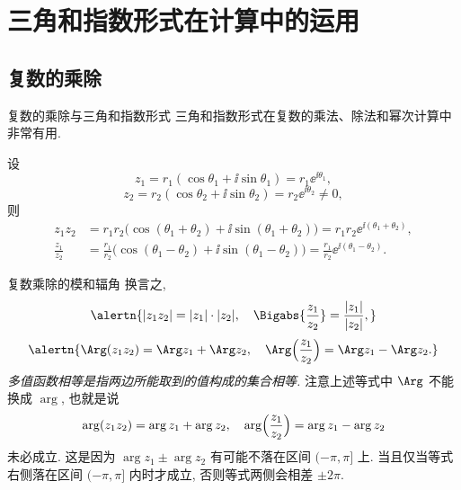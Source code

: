\section{三角和指数形式在计算中的运用}

\subsection{复数的乘除}

\begin{frame}{复数的乘除与三角和指数形式}
	\onslide<+->
	三角和指数形式在复数的乘法、除法和幂次计算中非常有用.
	\onslide<+->
	\begin{theorem}
		设
		\[
			z_1=r_1(\cos\theta_1+\ii\sin\theta_1)=r_1\ee^{\ii\theta_1},
		\]
		\[
			z_2=r_2(\cos\theta_2+\ii\sin\theta_2)=r_2\ee^{\ii\theta_2}\neq 0,
		\]
		则
		\begin{align*}
			z_1z_2&
			=r_1r_2\bigl(\cos(\theta_1+\theta_2)+\ii\sin(\theta_1+\theta_2)\bigr)
			=r_1r_2\ee^{\ii(\theta_1+\theta_2)},\\
			\frac{z_1}{z_2}&
			=\frac{r_1}{r_2}\bigl(\cos(\theta_1-\theta_2)+\ii\sin(\theta_1-\theta_2)\bigr)
			=\frac{r_1}{r_2}\ee^{\ii(\theta_1-\theta_2)}.
		\end{align*}
	\end{theorem}
\end{frame}


\begin{frame}{复数乘除的模和辐角}
	\onslide<+->
	换言之,
	\[
		\alertn{|z_1z_2|=|z_1|\cdot|z_2|,\quad\Bigabs{\frac{z_1}{z_2}}=\frac{|z_1|}{|z_2|},}
	\]
	\onslide<+->
	\[
		\alertn{\Arg(z_1z_2)=\Arg z_1+\Arg z_2,\quad
		\Arg\Bigl(\frac{z_1}{z_2}\Bigr)=\Arg z_1-\Arg z_2.}
	\]
	\onslide<+->
	\emph{多值函数相等是指两边所能取到的值构成的集合相等.}
	\onslide<+->
	注意上述等式中 $\Arg$ 不能换成 $\arg$,
	\onslide<+->
	也就是说
	\[
		\arg(z_1z_2)=\arg z_1+\arg z_2,\quad
		\arg\Bigl(\frac{z_1}{z_2}\Bigr)=\arg z_1-\arg z_2
	\]
	\alert{未必成立}.
	\onslide<+->
	这是因为 $\arg z_1\pm\arg z_2$ 有可能不落在区间 $(-\pi,\pi]$ 上.
	\onslide<+->
	当且仅当等式右侧落在区间 $(-\pi,\pi]$ 内时才成立, 否则等式两侧会相差 $\pm2\pi$.
\end{frame}


